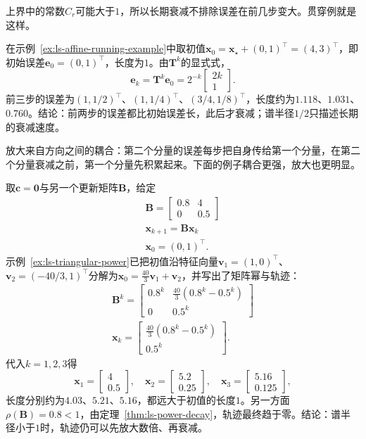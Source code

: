 上界中的常数$C_r$可能大于$1$，所以长期衰减不排除误差在前几步变大。贯穿例就是这样。
\begin{example}[贯穿例的暂时放大]
\label{ex:ls-running-transient}
在示例~\ref{ex:ls-affine-running-example}中取初值$\bm x_0=\bm x_\star+(0,1)^\top=(4,3)^\top$，即初始误差$\bm e_0=(0,1)^\top$，长度为$1$。由$\bm T^k$的显式式，
\[
 \bm e_k=\bm T^k\bm e_0=2^{-k}\begin{bmatrix}2k\\1\end{bmatrix}.
\]
前三步的误差为$(1,1/2)^\top$、$(1,1/4)^\top$、$(3/4,1/8)^\top$，长度约为$1.118$、$1.031$、$0.760$。结论：前两步的误差都比初始误差长，此后才衰减；谱半径$1/2$只描述长期的衰减速度。
\end{example}
放大来自方向之间的耦合：第二个分量的误差每步把自身传给第一个分量，在第二个分量衰减之前，第一个分量先积累起来。下面的例子耦合更强，放大也更明显。
\begin{example}[非正规矩阵的瞬态放大]
\label{ex:ls-transient-growth}
取$\bm c=\bm0$与另一个更新矩阵$\bm B$，给定
\begin{equation}
\begin{gathered}
\bm B=\begin{bmatrix}0.8&4\\0&0.5\end{bmatrix}\\
\bm x_{k+1}=\bm B\bm x_k\\
\bm x_0=(0,1)^{\top}.
\end{gathered}
\label{eq:ch06-fixed-iteration-example}
\end{equation}
示例~\ref{ex:ls-triangular-power}已把初值沿特征向量$\bm v_1=(1,0)^{\top}$、$\bm v_2=(-40/3,1)^{\top}$分解为$\bm x_0=\tfrac{40}{3}\bm v_1+\bm v_2$，并写出了矩阵幂与轨迹：
\begin{equation}
\begin{gathered}
\bm B^k=
 \begin{bmatrix}
  0.8^k&\frac{40}{3}(0.8^k-0.5^k)\\
  0&0.5^k
 \end{bmatrix}\\
\bm x_k=
 \begin{bmatrix}\frac{40}{3}(0.8^k-0.5^k)\\0.5^k\end{bmatrix}.
\end{gathered}
\label{eq:ch06-diagonalizable-finite-trajectory}
\end{equation}
代入$k=1,2,3$得
\[
 \bm x_1=\begin{bmatrix}4\\0.5\end{bmatrix},\quad
 \bm x_2=\begin{bmatrix}5.2\\0.25\end{bmatrix},\quad
 \bm x_3=\begin{bmatrix}5.16\\0.125\end{bmatrix},
\]
长度分别约为$4.03$、$5.21$、$5.16$，都远大于初值的长度$1$。另一方面$\rho(\bm B)=0.8<1$，由定理~\ref{thm:ls-power-decay}，轨迹最终趋于零。结论：谱半径小于$1$时，轨迹仍可以先放大数倍、再衰减。
\end{example}
